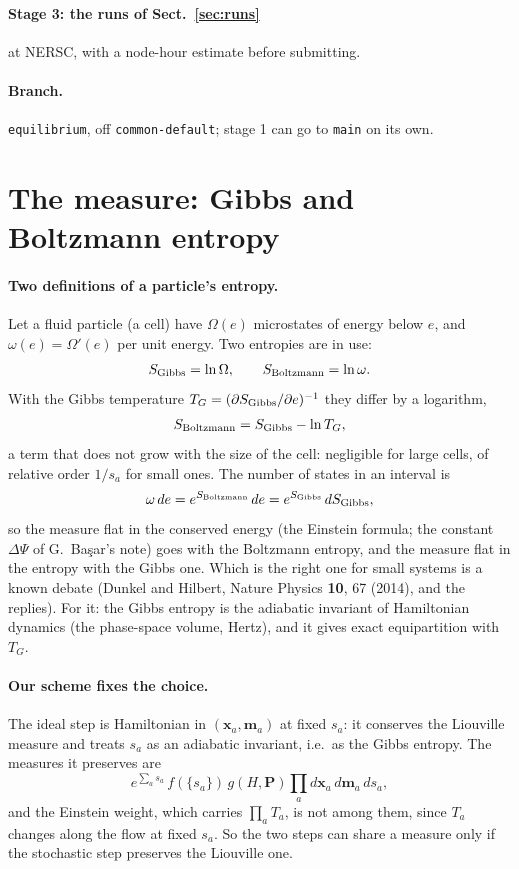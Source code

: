 \documentclass[11pt,aps,preprint,nofootinbib,superscriptaddress,tightenlines]{revtex4-2}
\def\st{\begin{equation}}
\def\stp{\end{equation}}
\def\Sect#1{Sect.~\ref{#1}}
\let\oldparagraph\paragraph
\renewcommand{\paragraph}{\par\bigskip\oldparagraph}
\begin{document}
\paragraph{Stage 3: the runs of \Sect{sec:runs}} at NERSC, with a node-hour estimate before submitting.

\paragraph{Branch.}  \texttt{equilibrium}, off \texttt{common-default}; stage 1 can go to \texttt{main} on its own.

\appendix
\section{The measure: Gibbs and Boltzmann entropy}
\label{app:gibbs}

\paragraph{Two definitions of a particle's entropy.}  Let a fluid particle (a cell) have $\Omega(e)$ microstates of energy below $e$,
and $\omega(e)=\Omega'(e)$ per unit energy.  Two entropies are in use:
\st
S_{\rm Gibbs}=\ln\Omega,\qquad S_{\rm Boltzmann}=\ln\omega .
\stp
With the Gibbs temperature $T_G=(\partial S_{\rm Gibbs}/\partial e)^{-1}$ they differ by a logarithm,
\st
S_{\rm Boltzmann}=S_{\rm Gibbs}-\ln T_G ,
\stp
a term that does not grow with the size of the cell: negligible for large cells, of relative order $1/s_a$ for small ones.  The
number of states in an interval is
\st
\omega\,de=e^{S_{\rm Boltzmann}}\,de=e^{S_{\rm Gibbs}}\,dS_{\rm Gibbs} ,
\stp
so the measure flat in the conserved energy (the Einstein formula; the constant $\Delta\Psi$ of G.~Ba\c{s}ar's note) goes with the
Boltzmann entropy, and the measure flat in the entropy with the Gibbs one.  Which is the right one for small systems is a
known debate (Dunkel and Hilbert, Nature Physics \textbf{10}, 67 (2014), and the replies).  For it: the Gibbs entropy is the
adiabatic invariant of Hamiltonian dynamics (the phase-space volume, Hertz), and it gives exact equipartition with $T_G$.

\paragraph{Our scheme fixes the choice.}  The ideal step is Hamiltonian in $(\bm x_a,\bm m_a)$ at fixed $s_a$: it conserves the
Liouville measure and treats $s_a$ as an adiabatic invariant, i.e.\ as the Gibbs entropy.  The measures it preserves are
\st
e^{\sum_as_a}\,f(\{s_a\})\,g(H,\bm P)\prod_ad\bm x_a\,d\bm m_a\,ds_a ,
\stp
and the Einstein weight, which carries $\prod_aT_a$, is not among them, since $T_a$ changes along the flow at fixed $s_a$.  So the
two steps can share a measure only if the stochastic step preserves the Liouville one.
\end{document}
